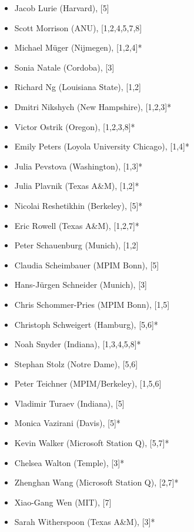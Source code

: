 \documentclass[11pt]{article}
\begin{document}
\begin{multicols}{2}
\begin{itemize}
\item Jacob Lurie (Harvard), [5]
\item Scott Morrison (ANU), [1,2,4,5,7,8]
\item Michael M\"uger (Nijmegen), [1,2,4]*
\item Sonia Natale (Cordoba), [3]
\item Richard Ng (Louisiana State), [1,2]
\item Dmitri Nikshych (New Hampshire), [1,2,3]*
\item Victor Ostrik (Oregon), [1,2,3,8]*
\item Emily Peters (Loyola University Chicago), [1,4]*
\item Julia Pevstova (Washington), [1,3]*
\item Julia Plavnik (Texas A\&M), [1,2]*
\item Nicolai Reshetikhin (Berkeley), [5]*
\item Eric Rowell (Texas A\&M), [1,2,7]*
\item Peter Schauenburg (Munich), [1,2]
\item Claudia Scheimbauer (MPIM Bonn), [5]
\item Hans-J\"urgen Schneider (Munich), [3]
\item Chris Schommer-Pries (MPIM Bonn), [1,5]
\item Christoph Schweigert (Hamburg), [5,6]*
\item Noah Snyder (Indiana), [1,3,4,5,8]*
\item Stephan Stolz (Notre Dame), [5,6]
\item Peter Teichner (MPIM/Berkeley), [1,5,6]
\item Vladimir Turaev (Indiana), [5]
\item Monica Vazirani (Davis), [5]*
\item Kevin Walker (Microsoft Station Q), [5,7]*
\item Chelsea Walton (Temple), [3]*
\item Zhenghan Wang (Microsoft Station Q), [2,7]*
\item Xiao-Gang Wen (MIT), [7]
\item Sarah Witherspoon (Texas A\&M), [3]*
\end{itemize}
\end{multicols}
\end{document}
